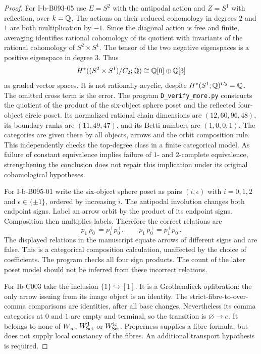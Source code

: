 \begin{proof}
For I-b-B093-05 use $E=S^2$ with the antipodal action and $Z=S^1$ with reflection, over $k=\mathbb Q$. The actions on their reduced cohomology in degrees $2$ and $1$ are both multiplication by $-1$. Since the diagonal action is free and finite, averaging identifies rational cohomology of its quotient with invariants of the rational cohomology of $S^2\times S^1$. The tensor of the two negative eigenspaces is a positive eigenspace in degree $3$. Thus
\[
 H^*((S^2\times S^1)/C_2;\mathbb Q)
   \cong \mathbb Q[0]\oplus\mathbb Q[3]
\]
as graded vector spaces. It is not rationally acyclic, despite $H^*(S^1;\mathbb Q)^{C_2}=\mathbb Q$. The omitted cross term is the error. The program \texttt{D\_verify\_more.py} constructs the quotient of the product of the six-object sphere poset and the reflected four-object circle poset. Its normalized rational chain dimensions are $(12,60,96,48)$, its boundary ranks are $(11,49,47)$, and its Betti numbers are $(1,0,0,1)$. The categories are given there by all objects, arrows and the orbit composition rule. This independently checks the top-degree class in a finite categorical model. As failure of constant equivalence implies failure of $1$- and $2$-complete equivalence, strengthening the conclusion does not repair this implication under its original cohomological hypotheses.

For I-b-B095-01 write the six-object sphere poset as pairs $(i,\epsilon)$ with $i=0,1,2$ and $\epsilon\in\{\pm1\}$, ordered by increasing $i$. The antipodal involution changes both endpoint signs. Label an arrow orbit by the product of its endpoint signs. Composition then multiplies labels. Therefore the correct relations are
\[
 p_1^-p_0^-=p_1^+p_0^+,\qquad
 p_1^-p_0^+=p_1^+p_0^-.
\]
The displayed relations in the manuscript equate arrows of different signs and are false. This is a categorical composition calculation, unaffected by the choice of coefficients. The program checks all four sign products. The count of the later poset model should not be inferred from these incorrect relations.

For Ib-C003 take the inclusion $\{1\}\hookrightarrow[1]$. It is a Grothendieck opfibration: the only arrow issuing from its image object is an identity. The strict-fibre-to-over-comma comparisons are identities, after all base changes. Nevertheless its comma categories at $0$ and $1$ are empty and terminal, so the transition is $\varnothing\to e$. It belongs to none of $W_\infty$, $W^1_{\mathsf{Set}}$ or $W^{\mathrm{lc}}_{\mathsf{Set}}$. Properness supplies a fibre formula, but does not supply local constancy of the fibres. An additional transport hypothesis is required.


\end{proof}
